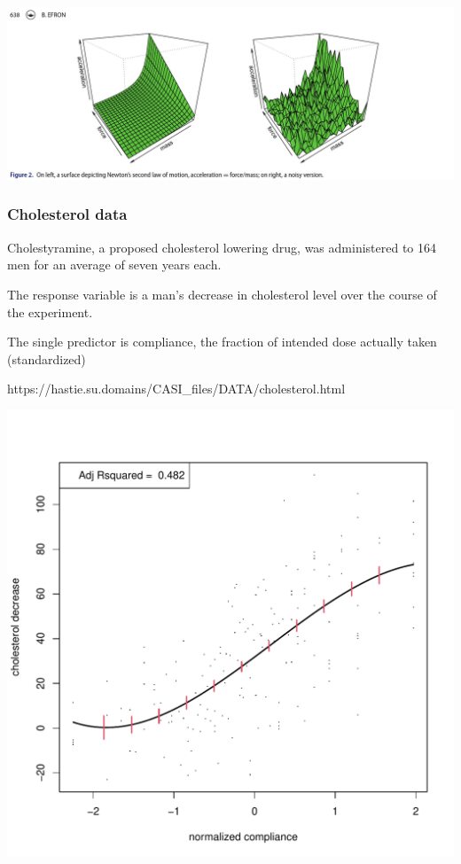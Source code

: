 \begin{frame}[fragile]

\includegraphics[scale=.2]{images/Figure_2}

\end{frame}
\begin{frame}[fragile]\frametitle{Cholesterol data}

\bi
\item Cholestyramine, a proposed cholesterol lowering drug, was administered to 164 men for an average of seven years each.

\item The response variable is a man's decrease in cholesterol level over the course of the experiment.

\item The single predictor is compliance, the fraction of intended dose actually taken (standardized)

\item https://hastie.su.domains/CASI\_files/DATA/cholesterol.html
\ei

\end{frame}
\begin{frame}[fragile]

\centering
\includegraphics[scale=.5]{images/Figure_1}

\end{frame}











